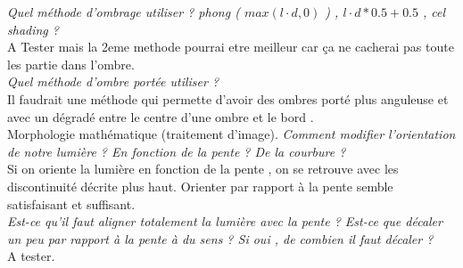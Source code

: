 \documentclass[a4paper]{article}
\begin{document}
\textit{ Quel méthode d'ombrage utiliser ? phong ( $max(l\cdot d, 0)$ ) , $ l\cdot d*0.5 + 0.5$ , cel shading ?}\\
A Tester mais la 2eme methode pourrai etre meilleur car ça ne cacherai pas toute les partie dans l'ombre. \\
\textit{ Quel méthode d'ombre portée utiliser ? }\\
 Il faudrait une méthode qui permette d'avoir des ombres porté plus anguleuse et avec un dégradé entre le centre d'une ombre et le bord . \\
 Morphologie mathématique (traitement d'image). 
\textit{ Comment modifier l'orientation de notre lumière ? En fonction de la pente ? De la courbure ?}\\
Si on oriente la lumière en fonction de la pente , on se retrouve avec les discontinuité décrite plus haut. Orienter par rapport à la pente semble satisfaisant et suffisant.\\
\textit{ Est-ce qu'il faut aligner totalement la lumière avec la pente ? Est-ce que décaler un peu par rapport à la pente à du sens ? Si oui , de combien il faut décaler ? }\\
A tester. \\
  
\end{document}
